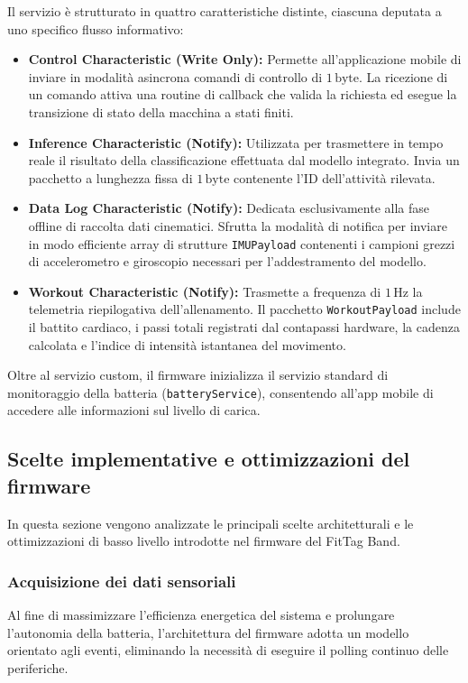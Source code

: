 Il servizio è strutturato in quattro caratteristiche distinte, ciascuna deputata a uno specifico flusso informativo:
\begin{itemize}
    \item \textbf{Control Characteristic (Write Only):} Permette all'applicazione mobile di inviare in modalità asincrona comandi di controllo di $1\,\text{byte}$. La ricezione di un comando attiva una routine di callback che valida la richiesta ed esegue la transizione di stato della macchina a stati finiti.
    \item \textbf{Inference Characteristic (Notify):} Utilizzata per trasmettere in tempo reale il risultato della classificazione effettuata dal modello integrato. Invia un pacchetto a lunghezza fissa di $1\,\text{byte}$ contenente l'ID dell'attività rilevata.
    \item \textbf{Data Log Characteristic (Notify):} Dedicata esclusivamente alla fase offline di raccolta dati cinematici. Sfrutta la modalità di notifica per inviare in modo efficiente array di strutture \texttt{IMUPayload} contenenti i campioni grezzi di accelerometro e giroscopio necessari per l'addestramento del modello.
    \item \textbf{Workout Characteristic (Notify):} Trasmette a frequenza di $1\,\text{Hz}$ la telemetria riepilogativa dell'allenamento. Il pacchetto \texttt{WorkoutPayload} include il battito cardiaco, i passi totali registrati dal contapassi hardware, la cadenza calcolata e l'indice di intensità istantanea del movimento.
\end{itemize}

Oltre al servizio custom, il firmware inizializza il servizio standard di monitoraggio della batteria (\texttt{batteryService}), consentendo all'app mobile di accedere alle informazioni sul livello di carica.

\subsection{Scelte implementative e ottimizzazioni del firmware}

In questa sezione vengono analizzate le principali scelte architetturali e le ottimizzazioni di basso livello introdotte nel firmware del FitTag Band.

\subsubsection{Acquisizione dei dati sensoriali}
Al fine di massimizzare l'efficienza energetica del sistema e prolungare l'autonomia della batteria, l'architettura del firmware adotta un modello orientato agli eventi, eliminando la necessità di eseguire il polling continuo delle periferiche.

